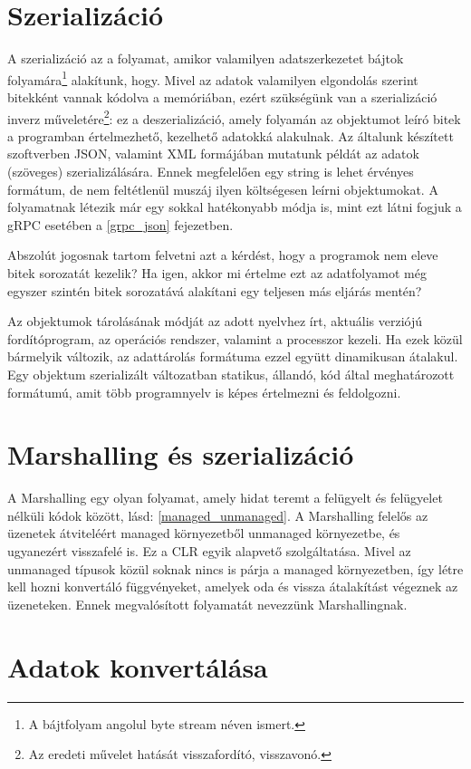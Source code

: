 \documentclass[tocnopagenum]{thesis-ekf}
\begin{document}
	\section{Szerializáció}
	A szerializáció az a folyamat, amikor valamilyen adatszerkezetet bájtok folyamára\footnote{A bájtfolyam angolul byte stream néven ismert.} alakítunk, hogy. Mivel az adatok valamilyen elgondolás szerint bitekként vannak kódolva a memóriában, ezért szükségünk van a szerializáció inverz műveletére\footnote{Az eredeti művelet hatását visszafordító, visszavonó.}: ez a deszerializáció, amely folyamán az objektumot leíró bitek a programban értelmezhető, kezelhető adatokká alakulnak. Az általunk készített szoftverben JSON, valamint XML formájában mutatunk példát az adatok (szöveges) szerializálására. Ennek megfelelően egy string is lehet érvényes formátum, de nem feltétlenül muszáj ilyen költségesen leírni objektumokat. A folyamatnak létezik már egy sokkal hatékonyabb módja is, mint ezt látni fogjuk a gRPC esetében a \ref{grpc_json} fejezetben. 
	
	Abszolút jogosnak tartom felvetni azt a kérdést, hogy a programok nem eleve bitek sorozatát kezelik? Ha igen, akkor mi értelme ezt az adatfolyamot még egyszer szintén bitek sorozatává alakítani egy teljesen más eljárás mentén?
	
	Az objektumok tárolásának módját az adott nyelvhez írt, aktuális verziójú fordítóprogram, az operációs rendszer, valamint a processzor kezeli. Ha ezek közül bármelyik változik, az adattárolás formátuma ezzel együtt dinamikusan átalakul. Egy objektum szerializált változatban statikus, állandó, kód által meghatározott formátumú, amit több programnyelv is képes értelmezni és feldolgozni. 
	\cite{sof_serialization}
	\section{Marshalling és szerializáció}
	A Marshalling egy olyan folyamat, amely hidat teremt a felügyelt és felügyelet nélküli kódok között, lásd: \ref{managed_unmanaged}. A Marshalling felelős az üzenetek átviteléért managed környezetből unmanaged környezetbe, és ugyanezért visszafelé is. Ez a CLR egyik alapvető szolgáltatása. Mivel az unmanaged típusok közül soknak nincs is párja a managed környezetben, így létre kell hozni konvertáló függvényeket, amelyek oda és vissza átalakítást végeznek az üzeneteken. Ennek megvalósított folyamatát nevezzünk Marshallingnak.
	\cite{marshalling_serialization}
	\section{Adatok konvertálása}
\end{document}
